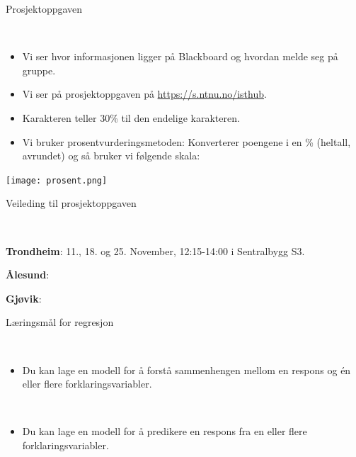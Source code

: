 \documentclass[10pt,ignorenonframetext,]{beamer}
\providecommand{\tightlist}{%
  \setlength{\itemsep}{0pt}\setlength{\parskip}{0pt}}
\begin{document}
\begin{frame}{Prosjektoppgaven}
\protect\hypertarget{prosjektoppgaven}{}

\(~\)

\begin{itemize}
\tightlist
\item
  Vi ser hvor informasjonen ligger på Blackboard og hvordan melde seg på
  gruppe.
\end{itemize}

\vspace{2mm}

\begin{itemize}
\tightlist
\item
  Vi ser på prosjektoppgaven på \url{https://s.ntnu.no/isthub}.
\end{itemize}

\vspace{2mm}

\begin{itemize}
\tightlist
\item
  Karakteren teller 30\% til den endelige karakteren.
\end{itemize}

\vspace{2mm}

\begin{itemize}
\tightlist
\item
  Vi bruker prosentvurderingsmetoden: Konverterer poengene i en \%
  (heltall, avrundet) og så bruker vi følgende skala:
\end{itemize}

\centering

\texttt{[image: prosent.png]}

\end{frame}

\begin{frame}{Veileding til prosjektoppgaven}
\protect\hypertarget{veileding-til-prosjektoppgaven}{}

\(~\)

\textbf{Trondheim}: 11., 18. og 25. November, 12:15-14:00 i Sentralbygg
S3.

\textbf{Ålesund}:

\textbf{Gjøvik}:

\end{frame}

\begin{frame}{Læringsmål for regresjon}
\protect\hypertarget{luxe6ringsmuxe5l-for-regresjon}{}

\(~\)

\begin{itemize}
\tightlist
\item
  Du kan lage en modell for å forstå sammenhengen mellom en respons og
  én eller flere forklaringsvariabler.
\end{itemize}

\(~\)

\begin{itemize}
\tightlist
\item
  Du kan lage en modell for å predikere en respons fra en eller flere
  forklaringsvariabler.
\end{itemize}

\end{frame}
\end{document}
